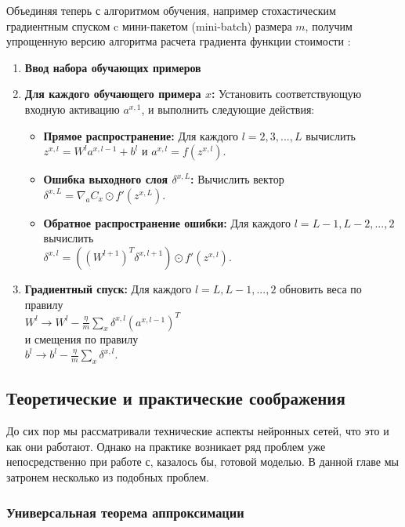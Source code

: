 Объединяя теперь с алгоритмом обучения, например стохастическим градиентным 
спуском c мини-пакетом (mini-batch) размера $m$, получим упрощенную версию 
алгоритма расчета градиента функции стоимости \cite{NN_Nielsen}:
\begin{enumerate}
    \item \textbf{Ввод набора обучающих примеров}
    \item \textbf{Для каждого обучающего примера $x$:} Установить соответствующую входную активацию $a^{x,1}$, и выполнить следующие действия:
    \begin{itemize}
        \item \textbf{Прямое распространение:} Для каждого $l=2,3,...,L$ вычислить \\$z^{x,l}=W^l a^{x,l-1} + b^l$ и $a^{x,l} = f(z^{x,l})$. 
        \item \textbf{Ошибка выходного слоя $\delta^{x,L}$:} Вычислить вектор\\ $\delta^{x,L}=\nabla_a C_x \odot f'(z^{x,L})$.
        \item \textbf{Обратное распространение ошибки:} Для каждого $l=L-1, L-2, ..., 2$ вычислить \\$\delta^{x,l}=((W^{l+1})^T \delta^{x,l+1}) \odot f'(z^{x,l})$.
    \end{itemize}
    \item \textbf{Градиентный спуск:} Для каждого $l=L,L-1,...,2$ обновить веса по правилу\\$W^l \rightarrow W^l - \frac{\eta}{m} \sum_x \delta^{x,l} (a^{x,l-1})^T$\\и смещения по правилу\\$b^l \rightarrow b^l - \frac{\eta}{m} \sum_x \delta^{x,l}$.
\end{enumerate}

\subsection{Теоретические и практические соображения}

До сих пор мы рассматривали технические аспекты нейронных сетей, что это и как они работают. 
Однако на практике возникает ряд проблем уже непосредственно при работе с, казалось бы, готовой моделью. 
В данной главе мы затронем несколько из подобных проблем.

\subsubsection{Универсальная теорема аппроксимации}

